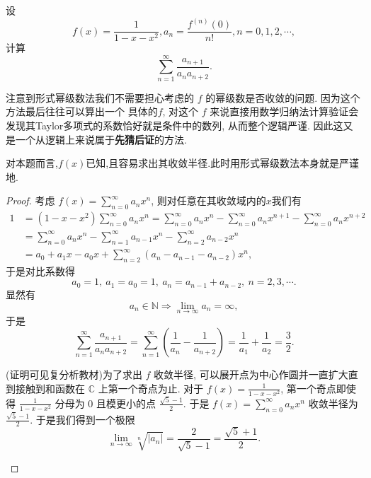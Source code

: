 \documentclass[../../main.tex]{subfiles}
\begin{document}
\begin{example}
设
\[
f(x)=\frac{1}{1 - x - x^2}, a_n=\frac{f^{(n)}(0)}{n!}, n = 0,1,2,\cdots,
\]
计算
\[
\sum_{n = 1}^{\infty}\frac{a_{n + 1}}{a_n a_{n + 2}}.
\]
\end{example}
\begin{note}
注意到形式幂级数法我们不需要担心考虑的 \( f \) 的幂级数是否收敛的问题. 因为这个方法最后往往可以算出一个 具体的\( f \), 对这个 \( f \) 来说直接用数学归纳法计算验证会发现其Taylor多项式的系数恰好就是条件中的数列, 从而整个逻辑严谨. 因此这又是一个从逻辑上来说属于\textbf{先猜后证}的方法.

对本题而言,$f(x)$已知,且容易求出其收敛半径.此时用形式幂级数法本身就是严谨地.
\end{note}
\begin{proof}
考虑 \( f(x)=\sum_{n = 0}^{\infty}a_n x^n \), 则对任意在其收敛域内的$x$我们有
\begin{align}
1&=(1 - x - x^2)\sum_{n = 0}^{\infty}a_n x^n=\sum_{n = 0}^{\infty}a_n x^n-\sum_{n = 0}^{\infty}a_n x^{n + 1}-\sum_{n = 0}^{\infty}a_n x^{n + 2}\nonumber \\
&=\sum_{n = 0}^{\infty}a_n x^n-\sum_{n = 1}^{\infty}a_{n - 1}x^n-\sum_{n = 2}^{\infty}a_{n - 2}x^n\nonumber \\
&=a_0 + a_1 x - a_0 x + \sum_{n = 2}^{\infty}(a_n - a_{n - 1} - a_{n - 2})x^n,\nonumber
\end{align}
于是对比系数得
\[
a_0 = 1,\ a_1 = a_0 = 1,\ a_n = a_{n - 1} + a_{n - 2},\ n = 2,3,\cdots. \label{eq:1}
\]
显然有
\[
a_n\in\mathbb{N}\Rightarrow\lim_{n\rightarrow\infty}a_n=\infty,
\]
于是
\[
\sum_{n = 1}^{\infty}\frac{a_{n + 1}}{a_n a_{n + 2}}=\sum_{n = 1}^{\infty}\left(\frac{1}{a_n}-\frac{1}{a_{n + 2}}\right)=\frac{1}{a_1}+\frac{1}{a_2}=\frac{3}{2}.
\]
\begin{remark}
(证明可见复分析教材)为了求出 \( f \) 收敛半径, 可以展开点为中心作圆并一直扩大直到接触到和函数在 \( \mathbb{C} \) 上第一个奇点为止. 对于 \( f(x)=\frac{1}{1 - x - x^2} \), 第一个奇点即使得 \( \frac{1}{1 - x - x^2} \) 分母为 0 且模更小的点 \( \frac{\sqrt{5}-1}{2} \). 于是 \( f(x)=\sum_{n = 0}^{\infty}a_n x^n \) 收敛半径为 \( \frac{\sqrt{5}-1}{2} \). 于是我们得到一个极限
\[
\lim_{n\rightarrow\infty}\sqrt[n]{|a_n|}=\frac{2}{\sqrt{5}-1}=\frac{\sqrt{5}+1}{2}.
\]
\end{remark}
\end{proof}
\end{document}
